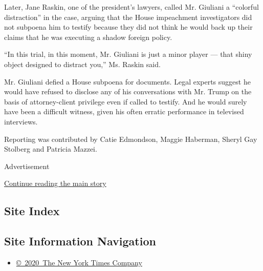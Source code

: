 Later, Jane Raskin, one of the president's lawyers, called Mr. Giuliani
a ``colorful distraction'' in the case, arguing that the House
impeachment investigators did not subpoena him to testify because they
did not think he would back up their claims that he was executing a
shadow foreign policy.

``In this trial, in this moment, Mr. Giuliani is just a minor player ---
that shiny object designed to distract you,'' Ms. Raskin said.

Mr. Giuliani defied a House subpoena for documents. Legal experts
suggest he would have refused to disclose any of his conversations with
Mr. Trump on the basis of attorney-client privilege even if called to
testify. And he would surely have been a difficult witness, given his
often erratic performance in televised interviews.

Reporting was contributed by Catie Edmondson, Maggie Haberman, Sheryl
Gay Stolberg and Patricia Mazzei.

Advertisement

\protect\hyperlink{after-bottom}{Continue reading the main story}

\hypertarget{site-index}{%
\subsection{Site Index}\label{site-index}}

\hypertarget{site-information-navigation}{%
\subsection{Site Information
Navigation}\label{site-information-navigation}}

\begin{itemize}
\tightlist
\item
  \href{https://help.nytimes3xbfgragh.onion/hc/en-us/articles/115014792127-Copyright-notice}{©~2020~The
  New York Times Company}
\end{itemize}

